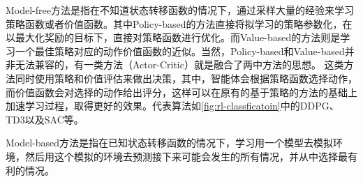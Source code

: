 Model-free方法是指在不知道状态转移函数的情况下，通过采样大量的经验来学习策略函数或者价值函数。其中Policy-based的方法直接将拟学习的策略参数化，在以最大化奖励的目标下，直接对策略函数进行优化。而Value-based的方法则是学习一个最佳策略对应的动作价值函数的近似。当然，Policy-based和Value-based并非无法兼容的，有一类方法（Actor-Critic）就是融合了两中方法的思想。
这类方法同时使用策略和价值评估来做出决策，其中，智能体会根据策略函数选择动作，而价值函数会对选择的动作给出评分，这样可以在原有的基于策略的方法的基础上加速学习过程，取得更好的效果。代表算法如\autoref{fig:rl-classficatoin}中的DDPG\cite{lillicrap2015continuous}、TD3\cite{fujimoto2018addressing}以及SAC\cite{haarnoja2018soft}等。

Model-based方法是指在已知状态转移函数的情况下，学习用一个模型去模拟环境，然后用这个模拟的环境去预测接下来可能会发生的所有情况，并从中选择最有利的情况。




